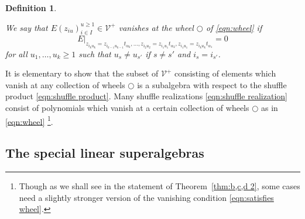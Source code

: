 \documentclass{amsart}
\newtheorem{definition}[subsection]{Definition}
\def\CV{{\mathcal{V}}}
\begin{document}
\medskip 

\begin{definition}
\label{def:wheel}

We say that $E(z_{iu})_{i \in I}^{u \geq 1} \in \CV^+$ \emph{vanishes at the wheel} $\bigcirc$ of \eqref{eqn:wheel} if 
\begin{equation}
\label{eqn:satisfies wheel}
E \Big|_{z_{i_ku_k} = z_{i_{k-1}u_{k-1}} t_{\alpha_k}, \dots, z_{i_2u_2} = z_{i_1u_1} t_{\alpha_2}, z_{i_1u_1} = z_{i_ku_k} t_{\alpha_1}} = 0
\end{equation}
for all $u_1,\dots,u_k \geq 1$ such that $u_s \neq u_{s'}$ if $s \neq s'$ and $i_s = i_{s'}$. 

\end{definition}

\medskip 

\noindent It is elementary to show that the subset of $\CV^+$ consisting of elements which vanish at any collection of wheels $\bigcirc$ is a subalgebra with respect to the shuffle product \eqref{eqn:shuffle product}. Many shuffle realizations \eqref{eqn:shuffle realization} consist of polynomials which vanish at a certain collection of wheels $\bigcirc$ as in \eqref{eqn:wheel} \footnote{Though as we shall see in the statement of Theorem~\ref{thm:b,c,d 2}, some cases need a slightly stronger version of the vanishing condition \eqref{eqn:satisfies wheel}.}.

\medskip 

\subsection{The special linear superalgebras}
\label{sub:sec a}
\end{document}
